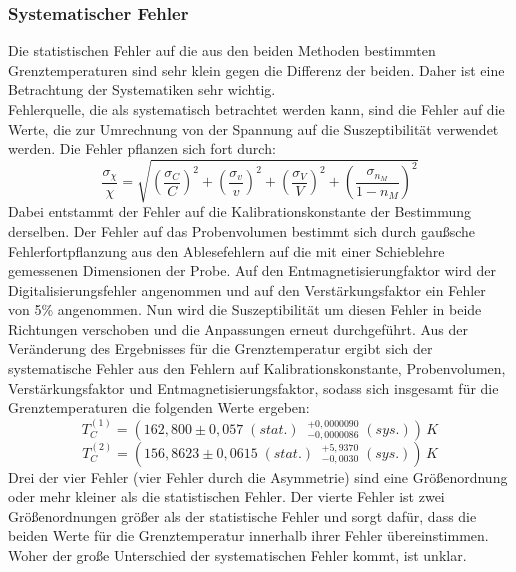 \documentclass[12pt,a4paper]{article}
\begin{document}
\subsubsection{Systematischer Fehler}
Die statistischen Fehler auf die aus den beiden Methoden bestimmten Grenztemperaturen sind sehr klein gegen die Differenz der beiden. Daher ist eine Betrachtung der Systematiken sehr wichtig. \\
Fehlerquelle, die als systematisch betrachtet werden kann, sind die Fehler auf die Werte, die zur Umrechnung von der Spannung auf die Suszeptibilität verwendet werden. Die Fehler pflanzen sich fort durch: 
\begin{equation*}
\dfrac{\sigma _{\chi}}{\chi} = \sqrt{\left( \dfrac{\sigma _C}{C} \right)^2 + \left( \dfrac{\sigma _v}{v} \right)^2 + \left( \dfrac{\sigma _V}{V} \right)^2 + \left( \dfrac{\sigma _{n_M}}{1 - n_M} \right)^2}
\end{equation*}
Dabei entstammt der Fehler auf die Kalibrationskonstante der Bestimmung derselben. Der Fehler auf das Probenvolumen bestimmt sich durch gaußsche Fehlerfortpflanzung aus den Ablesefehlern auf die mit einer Schieblehre gemessenen Dimensionen der Probe. Auf den Entmagnetisierungfaktor wird der Digitalisierungsfehler angenommen und auf den Verstärkungsfaktor ein Fehler von 5\% angenommen. Nun wird die Suszeptibilität um diesen Fehler in beide Richtungen verschoben und die Anpassungen erneut durchgeführt. Aus der Veränderung des Ergebnisses für die Grenztemperatur ergibt sich der systematische Fehler aus den Fehlern auf Kalibrationskonstante, Probenvolumen, Verstärkungsfaktor und Entmagnetisierungsfaktor, sodass sich insgesamt für die Grenztemperaturen die folgenden Werte ergeben:
\begin{equation*}
T_C^{(1)} = (162,800 \pm 0,057 \; (stat.) \; \; ^{+0,0000090}_{-0,0000086} \; (sys.)) \, \si{K}
\end{equation*}
\begin{equation*}
T_C^{(2)} = (156,8623 \pm 0,0615 \; (stat.) \; \; ^{+5,9370}_{-0,0030} \; (sys.)) \, \si{K}
\end{equation*}
Drei der vier Fehler (vier Fehler durch die Asymmetrie) sind eine Größenordnung oder mehr kleiner als die statistischen Fehler. Der vierte Fehler ist zwei Größenordnungen größer als der statistische Fehler und sorgt dafür, dass die beiden Werte für die Grenztemperatur innerhalb ihrer Fehler übereinstimmen. Woher der große Unterschied der systematischen Fehler kommt, ist unklar. \\
\end{document}

